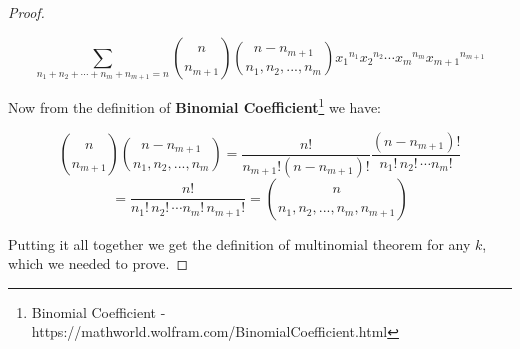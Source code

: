 \documentclass[a4paper]{article}
\begin{document}
\begin{proof}
\begin{center}
$$\sum_{n_1 + n_2 + \cdots + n_m + n_{m + 1} = n} \binom{n}{n_{m + 1} } \binom{n - n_{m + 1}}{n_1, n_2, ..., n_m} {x_1}^{n_1} {x_2}^{n_2} \cdots {x_m}^{n_m} {x_{m + 1} }^{n_{m + 1} }$$
\end{center}
Now from the definition of \textbf{Binomial Coefficient}\footnote{Binomial Coefficient - https://mathworld.wolfram.com/BinomialCoefficient.html} we have:
\begin{center}
$$\binom{n}{n_{m + 1} } \binom{n - n_{m + 1} } {n_1, n_2, ..., n_m} = \frac{n!}{n_{m + 1}! (n - n_{m + 1} )!} \frac{(n - n_{m + 1} )!} {n_1! \, n_2! \, \cdots n_m!}$$
$$= \frac{n!}{n_1! \, n_2! \, \cdots n_m! \, n_{m + 1}!} = \binom{n}{n_1, n_2, ..., n_m, n_{m + 1}}$$
\end{center}
Putting it all together we get the definition of multinomial theorem for any $k$, which we needed to prove.
\end{proof}
\end{document}
